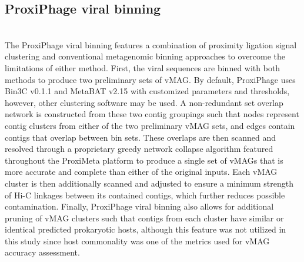 \subsection*{ProxiPhage viral binning} \hfill\\
	The ProxiPhage viral binning features a combination of proximity ligation signal clustering and conventional metagenomic binning approaches to overcome the limitations of either method. First, the viral sequences are binned with both methods to produce two preliminary sets of vMAG. By default, ProxiPhage uses Bin3C \cite{RN72} v0.1.1 and MetaBAT \cite{RN73} v2.15 with customized parameters and thresholds, however, other clustering software may be used. A non-redundant set overlap network is constructed from these two contig groupings such that nodes represent contig clusters from either of the two preliminary vMAG sets, and edges contain contigs that overlap between bin sets. These overlaps are then scanned and resolved through a proprietary greedy network collapse algorithm featured throughout the ProxiMeta \cite{RN16} platform to produce a single set of vMAGs that is more accurate and complete than either of the original inputs. Each vMAG cluster is then additionally scanned and adjusted to ensure a minimum strength of Hi-C linkages between its contained contigs, which further reduces possible contamination. Finally, ProxiPhage viral binning also allows for additional pruning of vMAG clusters such that contigs from each cluster have similar or identical predicted prokaryotic hosts, although this feature was not utilized in this study since host commonality was one of the metrics used for vMAG accuracy assessment. 

